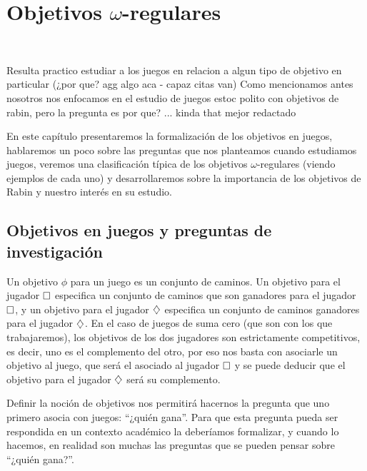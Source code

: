 \chapter{Objetivos $\omega$-regulares}
~\label{cap:objetivos}

Resulta practico estudiar a los juegos en relacion a algun tipo de objetivo en
particular (¿por que? agg algo aca - capaz citas van) Como mencionamos antes
nosotros nos enfocamos en el estudio de juegos estoc polito con objetivos de
rabin, pero la pregunta es por que? ... kinda that mejor redactado

En este capítulo presentaremos la formalización de los objetivos en juegos,
hablaremos un poco sobre las preguntas que nos planteamos cuando estudiamos
juegos, veremos una clasificación típica de los objetivos $\omega$-regulares
(viendo ejemplos de cada uno) y desarrollaremos sobre la importancia de los
objetivos de Rabin y nuestro interés en su estudio.

\section{Objetivos en juegos y preguntas de investigación}

Un objetivo $\phi$ para un juego es un conjunto de caminos. Un objetivo para el
jugador $\square$ especifica un conjunto de caminos que son ganadores para el
jugador $\square$, y un objetivo para el jugador $\diamondsuit$ especifica un conjunto
de caminos ganadores para el jugador $\diamondsuit$. En el caso de juegos de suma cero
(que son con los que trabajaremos), los objetivos de los dos jugadores son
estrictamente competitivos, es decir, uno es el complemento del otro, por eso
nos basta con asociarle un objetivo al juego, que será el asociado al jugador
$\square$ y se puede deducir que el objetivo para el jugador $\diamondsuit$ será su
complemento.


Definir la noción de objetivos nos permitirá hacernos la pregunta que uno
primero asocia con juegos: ``¿quién gana''. Para que esta pregunta pueda ser
respondida en un contexto académico la deberíamos formalizar, y cuando lo
hacemos, en realidad son muchas las preguntas que se pueden pensar sobre
``¿quién gana?''.

